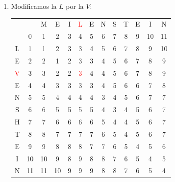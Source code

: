 \documentclass[10pt,a4paper,spanish]{report}
\theoremstyle{definition}
\theoremstyle{remark}
\begin{document}
\begin{enumerate}
\item Modificamos la $L$ por la $V$:
\begin{center}
\begin{tabular}{c|c|c|c|c|c|c|c|c|c|c|c|c|}
\multicolumn{2}{r}{} & \multicolumn{1}{c}{M} & \multicolumn{1}{c}{E} & \multicolumn{1}{c}{I} & \multicolumn{1}{c}{\textcolor{Red}{L}} & \multicolumn{1}{c}{E} & \multicolumn{1}{c}{N} & \multicolumn{1}{c}{S} & \multicolumn{1}{c}{T} & \multicolumn{1}{c}{E} & \multicolumn{1}{c}{I} & \multicolumn{1}{c}{N} \\ 
\cline{2-13} 
& 0 & 1 & 2 & 3 & 4 & 5 & 6 & 7 & 8 & 9 & 10 & 11 \\
\cline{2-13}
L & 1 & 1 & 2 & 3 & 3 & 4 & 5 & 6 & 7 & 8 & 9 & 10 \\
\cline{2-13} 
E & 2 & 2 & 1 & \cellcolor{Cyan}2 & 3 & 3 & 4 & 5 & 6 & 7 & 8 & 9 \\
\cline{2-13} 
\textcolor{Red}{V} & 3 & 3 & 2 & 2 & \textcolor{Red}{3} & 4 & 4 & 5 & 6 & 7 & 8 & 9 \\
\cline{2-13} 
E & 4 & 4 & 3 & 3 & 3 & \cellcolor{Green}3 & 4 & 5 & 6 & 6 & 7 & 8 \\
\cline{2-13} 
N & 5 & 5 & 4 & 4 & 4 & 4 & \cellcolor{Green}3 & 4 & 5 & 6 & 7 & 7 \\
\cline{2-13} 
S & 6 & 6 & 5 & 5 & 5 & 5 & 4 & \cellcolor{Green}3 & 4 & 5 & 6 & 7 \\
\cline{2-13} 
H & 7 & 7 & 6 & 6 & 6 & 6 & 5 & \cellcolor{Green}4 & 4 & 5 & 6 & 7 \\
\cline{2-13} 
T & 8 & 8 & 7 & 7 & 7 & 7 & 6 & 5 & \cellcolor{Green}4 & 5 & 6 & 7 \\
\cline{2-13}
E & 9 & 9 & 8 & 8 & 8 & 7 & 7 & 6 & 5 & \cellcolor{Green}4 & 5 & 6 \\
\cline{2-13} 
I & 10 & 10 & 9 & 8 & 9 & 8 & 8 & 7 & 6 & 5 & \cellcolor{Green}4 & 5 \\
\cline{2-13} 
N & 11 & 11 & 10 & 9 & 9 & 9 & 8 & 8 & 7 & 6 & 5 & \cellcolor{Green}4 \\
\cline{2-13} 
\end{tabular}
\end{center}


\end{enumerate}
\end{document}
